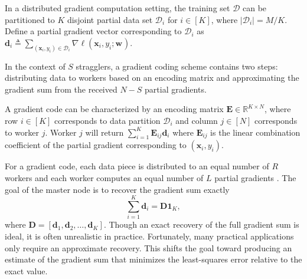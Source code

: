 \documentclass[lettersize,journal]{IEEEtran}
\renewcommand{\v}{\boldsymbol{v}}
\newcommand{\ones}[1]{\boldsymbol{1}_{#1}}
\newcommand{\F}{\mathcal{F}}
\newcommand{\BE}{\boldsymbol{E}}
\newcommand{\D}[1]{\mathcal{D}_{#1}}
\newcommand{\dd}[1]{\boldsymbol{d}_{#1}}
\newcommand{\xx}[1]{\boldsymbol{x}_{#1}}
\newcommand{\ww}[1]{\boldsymbol{w}_{#1}}
\newcommand{\DD}{\boldsymbol{D}}
\newcommand{\RR}{\mathbb{R}}
\newcommand{\lele}{\textcolor{cyan}}
\begin{document}
 In a distributed  gradient computation setting, the training set $\mathcal{D}$ can be partitioned to $K$ disjoint partial data set 
 $\mathcal{D}_i$ for $i\in[K]$, where $|\mathcal{D}_i| =M/K$.  Define a partial gradient vector corresponding to $\mathcal{D}_i$ as $\boldsymbol{d}_i \triangleq \sum_{(\xx{i},y_i)\in\mathcal{D}_i}\nabla\ell(\xx{i},y_i;\ww{})$. 
 
 In the context of $S$ stragglers, a gradient coding scheme contains two steps: distributing data to workers based on an encoding matrix and approximating the gradient sum from the received $N-S$ partial gradients.


A gradient code can be characterized by an encoding matrix $\BE\in \RR^{K\times N}$, where row $i\in [K]$ corresponds to data partition $\D{i}$ and column $j\in [N]$ corresponds to worker $j$. Worker $j$ will return $\sum_{i=1}^K \BE_{ij} \boldsymbol{d}_i$ where $\BE_{ij}$ is the linear combination coefficient of the partial gradient corresponding to $(\boldsymbol{x}_i, y_i)$.

For a gradient code, each data piece is distributed to an equal number of $R$ workers 
and each worker computes an equal number of $L$ partial gradients 
. The goal of the master node is to recover the gradient sum exactly
\begin{equation*}
     \sum_{i = 1}^K \dd{i} =\DD\ones{K},
\end{equation*}
where $\DD = [\dd{1}, \dd{2}, \dots, \dd{K}]$. 
Though an exact recovery of the full gradient sum is ideal, it is often unrealistic in practice. Fortunately, many practical applications only require an approximate recovery. This shifts the goal toward producing an estimate of the gradient sum that minimizes the least-squares error relative to the exact value.
\end{document}
